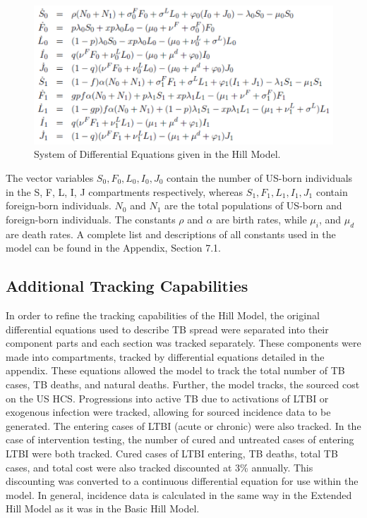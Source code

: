 \documentclass{amsart}
\begin{document}
\begin{figure}
  \begin{center}
    \includegraphics[scale=0.75]{figures/BasicHillEquations.pdf}
  \end{center}
  \caption{System of Differential Equations given in the Hill Model.}
  \label{fig:hillEquations}
\end{figure}

The vector variables $S_{0}, F_{0}, L_{0}, I_{0}, J_{0}$ contain the number of
US-born individuals in the S, F, L, I, J compartments respectively, whereas $S_{1},
F_{1}, L_{1}, I_{1}, J_{1}$ contain foreign-born individuals.  $N_{0}$ and
$N_{1}$ are the total populations of US-born and foreign-born individuals.
The constants $\rho$ and $\alpha$ are birth rates, while $\mu_{i}$, and $\mu_{d}$ are death rates.  
A complete list and descriptions of all constants used in the model can be found in the Appendix,
Section 7.1.

\subsection{Additional Tracking Capabilities}
In order to refine the tracking capabilities of the
Hill Model, the original differential equations used to describe TB spread were
separated into their component parts and each section was tracked separately.
These components were made into compartments, tracked by differential equations
detailed in the appendix. These equations allowed the model to track the total
number of TB cases, TB deaths, and  natural deaths. Further, the model tracks,
the sourced cost on the US HCS. Progressions into
active TB due to activations of LTBI or exogenous infection were tracked,
allowing for sourced incidence data to be generated. The entering cases of LTBI
(acute or chronic) were also tracked. In the case of intervention testing, the
number of cured and untreated cases of entering LTBI were both tracked. Cured
cases of LTBI entering, TB deaths, total TB cases, and total cost were also
tracked discounted at 3\% annually. This discounting was converted to a
continuous differential equation for use within the model. In general, incidence
data is calculated in the same way in the Extended Hill Model as it was in the Basic
Hill Model.
\end{document}
